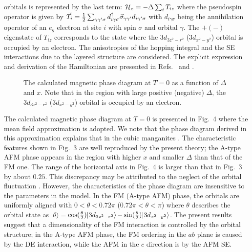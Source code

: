 orbitals is represented by the last term:  
$
{\cal H}_z=-\Delta \sum_i T_{iz} 
$ 
where the pseudospin operator is given by 
$\vec T_{i}={1 \over 2} \sum_{\gamma \gamma' \sigma} 
d_{i \gamma \sigma}^\dagger \vec \sigma_{\gamma \gamma'} d_{i \gamma' \sigma}$ 
with $d_{i \gamma \sigma}$ being the annihilation operator of an $e_g$ electron 
at site $i$ with spin $\sigma$ and orbital $\gamma$. 
%
The $+(-)$ eigenstate of $T_{iz}$ corresponds to the state where 
the $3d_{3z^2-r^2}$ ($3d_{x^2-y^2}$) orbital is occupied by an electron. 
%
The anisotropies of the hopping integral and the SE interactions 
due to the layered structure are considered. 
%
The explicit expression and derivation of the Hamiltonian are 
presented in Refs.~\cite{ishihara} and \cite{ishihara2}. 
%
\par
%
%
%
\begin{figure}
\columnwidth
\centerline{}
\caption{The calculated magnetic phase diagram at $T=0$ as a function of $\Delta$ and $x$. 
%
%
Note that in the region with large positive (negative) $\Delta$, 
the $3d_{3z^2-r^2}$ ($3d_{x^2-y^2}$) orbital is occupied by an electron.
%
}
\label{fig:fig4}
\end{figure}
%
The calculated magnetic phase diagram at $T=0$ is presented in Fig.~4 \cite{hamiltonian,maezono} 
where the mean field approximation is adopted. 
We note that the phase diagram derived in this approximation 
explains that in the cubic manganites \cite{okamoto}. 
%
The characteristic features shown in Fig.~3  
are well reproduced by the present theory; 
the A-type AFM phase appears in the region with higher $x$ 
and smaller $\Delta $ than that of the FM one. 
%
The range of the horizontal axis in Fig.~4 is larger than 
that in Fig.~3 by about $0.25$. 
This discrepancy may be attributed to the neglect of the orbital fluctuation \cite{ishihara3}.   
However, the characteristics of the phase diagram   
are insensitive to the parameters in the model. 
%
In the FM (A-type AFM) phase, the orbitals are uniformly aligned 
with $ 0<\theta <0.72\pi$ ($0.72\pi<\theta<\pi$)  
where $\theta$ describes the orbital state as 
$|\theta \rangle=$$\cos({\theta \over 2})|3d_{3z^2-r^2}\rangle$$-\sin({\theta \over 2})|3d_{x^2-y^2} \rangle$. 
%
The present results suggest that 
a dimensionality of the FM interaction is controlled by 
the orbital structure; 
in the A-type AFM phase, 
the FM ordering in the $ab$ plane 
is caused by the DE interaction, while the AFM in the $c$ direction is by the AFM SE. 

